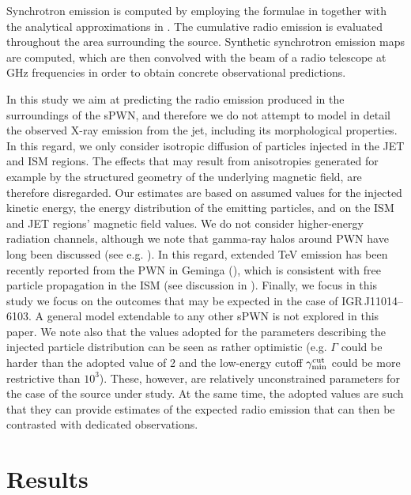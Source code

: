 \documentclass[letter]{aa}
\newcommand{\IGR}{IGR\,J11014--6103}
\begin{document}
Synchrotron emission is computed by employing the formulae in \cite{Pacholczyk1970} together with the analytical approximations in \citet{Aharonian2010}. The cumulative radio emission is evaluated throughout the area surrounding the source. Synthetic synchrotron emission maps are computed, which are then convolved with the beam of a radio telescope at GHz frequencies in order to obtain concrete observational predictions.

In this study we aim at predicting the radio emission produced in the surroundings of the sPWN, and therefore we do not attempt to model in detail the observed X-ray emission from the jet, including its morphological properties. In this regard, we only consider isotropic diffusion of particles injected in the JET and ISM regions. The effects that may result from anisotropies generated for example by the structured geometry of the underlying magnetic field, are therefore disregarded. Our estimates are based on assumed values for the injected kinetic energy, the energy distribution of the emitting particles, and on the ISM and JET regions' magnetic field values. We do not consider higher-energy radiation channels, although we note that gamma-ray halos around PWN have long been discussed (see e.g. \citealp{Aharonian1995}). In this regard, extended TeV emission has been recently reported from the PWN in Geminga (\citealp{Abeysekara2017}), which is consistent with free particle propagation in the ISM (see discussion in \citealp{Giacinti2020}). Finally, we focus in this study we focus on the outcomes that may be expected in the case of \IGR. A general model extendable to any other sPWN is not explored in this paper. We note also that the values adopted for the parameters describing the injected particle distribution can be seen as rather optimistic (e.g. $\Gamma $ could be harder than the adopted value of 2 and the low-energy cutoff $\gamma_{\rm min}^{ \rm cut}$ could be more restrictive than $10^3$). These, however, are relatively unconstrained parameters for the case of the source under study. At the same time, the adopted values are such that they can provide estimates of the expected radio emission that can then be contrasted with dedicated observations.





                                   \section{Results}
                                \label{section:results}
\end{document}
